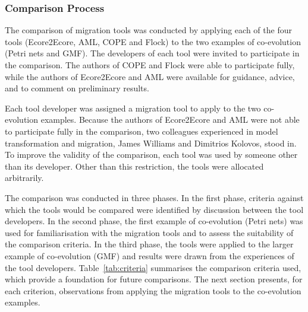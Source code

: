 \subsubsection{Comparison Process}
\label{subsec:method_process}
The comparison of migration tools was conducted by applying each of the four tools (Ecore2Ecore, AML, COPE and Flock) to the two examples of co-evolution (Petri nets and GMF). The developers of each tool were invited to participate in the comparison. The authors of COPE and Flock were able to participate fully, while the authors of Ecore2Ecore and AML were available for guidance, advice, and to comment on preliminary results.

Each tool developer was assigned a migration tool to apply to the two co-evolution examples. Because the authors of Ecore2Ecore and AML were not able to participate fully in the comparison, two colleagues experienced in model transformation and migration, James Williams and Dimitrios Kolovos, stood in. To improve the validity of the comparison, each tool was used by someone other than its developer. Other than this restriction, the tools were allocated arbitrarily.

The comparison was conducted in three phases. In the first phase, criteria against which the tools would be compared were identified by discussion between the tool developers. In the second phase, the first example of co-evolution (Petri nets) was used for familiarisation with the migration tools and to assess the suitability of the comparison criteria. In the third phase, the tools were applied to the larger example of co-evolution (GMF) and results were drawn from the experiences of the tool developers. Table~\ref{tab:criteria} summarises the comparison criteria used, which provide a foundation for future comparisons. The next section presents, for each criterion, observations from applying the migration tools to the co-evolution examples.

